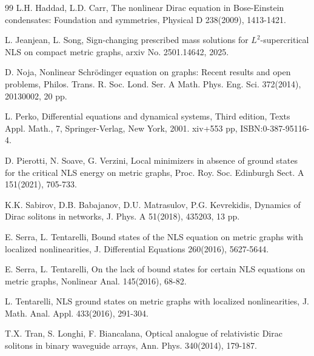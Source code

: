 \documentclass[11pt]{amsart}
\numberwithin{equation}{section}
\begin{document}
\begin{thebibliography}{99}
L.H. Haddad, L.D. Carr, The nonlinear Dirac equation in Bose-Einstein condensates: Foundation and symmetries, Physical D 238(2009), 1413-1421.

 L. Jeanjean, L. Song, Sign-changing prescribed mass solutions for $L^2$-supercritical NLS on compact metric graphs, arxiv No. 2501.14642, 2025.

D. Noja, Nonlinear Schr\"{o}dinger equation on graphs: Recent results and open problems, Philos. Trans. R. Soc. Lond. Ser. A Math. Phys. Eng. Sci. 372(2014), 20130002, 20 pp.

L. Perko, Differential equations and dynamical systems,
Third edition, Texts Appl. Math., 7, Springer-Verlag, New York, 2001. xiv+553 pp,
ISBN:0-387-95116-4.


D. Pierotti, N. Soave, G. Verzini, Local minimizers in absence of ground states for the critical NLS energy on metric graphs, Proc. Roy. Soc. Edinburgh Sect. A 151(2021), 705-733.

K.K. Sabirov, D.B. Babajanov, D.U. Matrasulov, P.G. Kevrekidis, Dynamics of Dirac solitons in networks, J. Phys. A 51(2018), 435203, 13 pp.

E. Serra, L. Tentarelli, Bound states of the NLS equation on metric graphs with localized nonlinearities, J. Differential Equations 260(2016), 5627-5644.

E. Serra, L. Tentarelli, On the lack of bound states for certain NLS equations on metric graphs, Nonlinear Anal. 145(2016), 68-82.

L. Tentarelli, NLS ground states on metric graphs with localized nonlinearities, J. Math. Anal. Appl. 433(2016), 291-304.

T.X. Tran, S. Longhi, F. Biancalana, Optical analogue of relativistic Dirac solitons in binary waveguide arrays, Ann. Phys. 340(2014), 179-187.

  \end{thebibliography}
  
\end{document}
